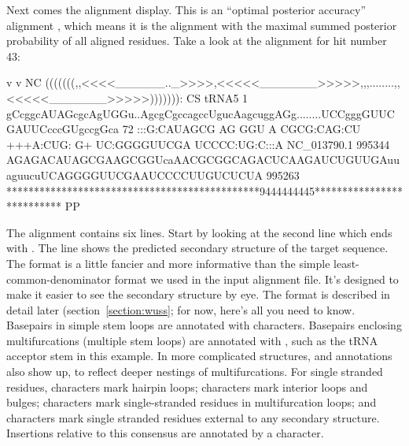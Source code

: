 Next comes the alignment display. This is an ``optimal
posterior accuracy'' alignment \cite{Holmes98}, which means it is the
alignment with the maximal summed posterior probability of all
aligned residues. Take a look at the alignment for hit number 43:

\begin{sreoutput}

                                 v         v                                                            NC
                     (((((((,,<<<<______.._>>>>,<<<<<_______>>>>>,,,........,,<<<<<_______>>>>>))))))): CS
        tRNA5      1 gCcggcAUAGcgcAgUGGu..AgcgCgccagccUgucAagcuggAGg........UCCgggGUUCGAUUCcccGUgccgGca 72    
                     :::G:CAUAGCG AG GGU  A CGCG:CAG:CU +++A:CUG: G+        UC:GGGGUUCGA UCCCC:UG:C:::A
  NC_013790.1 995344 AGAGACAUAGCGAAGCGGUcaAACGCGGCAGACUCAAGAUCUGUUGAuuaguucuUCAGGGGUUCGAAUCCCCUUGUCUCUA 995263
                     **********************************************9444444445************************** PP
\end{sreoutput}

The alignment contains six lines. Start by looking at the second line
which ends with .  The line shows the predicted secondary
structure of the target sequence. The format is a little fancier and
more informative than the simple least-common-denominator format we
used in the input alignment file. It's designed to make it easier to
see the secondary structure by eye. The format is described in detail
later (section~\ref{section:wuss}; for now, here's all you need to
know. Basepairs in simple stem loops are annotated with \otext{<>}
characters. Basepairs enclosing multifurcations (multiple stem loops)
are annotated with \otext{()}, such as the tRNA acceptor stem in this
example. In more complicated structures, \otext{[]} and \otext{\{\}}
annotations also show up, to reflect deeper nestings of
multifurcations. For single stranded residues, \otext{\_} characters
mark hairpin loops; \otext{-} characters mark interior loops and
bulges; \otext{,} characters mark single-stranded residues in
multifurcation loops; and \otext{:} characters mark single stranded
residues external to any secondary structure. Insertions relative to
this consensus are annotated by a  character.

